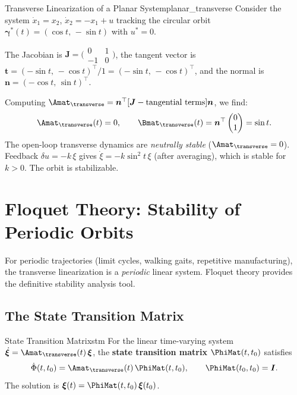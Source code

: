 \documentclass[12pt, openany]{book}
\theoremstyle{plain}
\newcommand{\traj}{\bm{\gamma}}
\begin{document}
\begin{example}{Transverse Linearization of a Planar System}{planar_transverse}
  Consider the system $\dot{x}_1 = x_2$, $\dot{x}_2 = -x_1 + u$ tracking
  the circular orbit $\traj^*(t) = (\cos t,\, -\sin t)$ with $u^* = 0$.

  The Jacobian is $\bm{J} = \bigl(\begin{smallmatrix} 0 & 1 \\ -1 & 0
  \end{smallmatrix}\bigr)$, the tangent vector is
  $\bm{t} = (-\sin t,\, -\cos t)^\top / 1 = (-\sin t,\, -\cos t)^\top$,
  and the normal is $\bm{n} = (-\cos t,\, \sin t)^\top$.

  Computing $\Amat_\transverse = \bm{n}^\top[\bm{J} - \text{tangential terms}]\bm{n}$,
  we find:
  \begin{equation}
    \Amat_\transverse(t) = 0, \qquad \Bmat_\transverse(t) = \bm{n}^\top
    \begin{pmatrix} 0 \\ 1 \end{pmatrix} = \sin t.
  \end{equation}
  The open-loop transverse dynamics are \emph{neutrally stable}
  ($\Amat_\transverse = 0$). Feedback $\delta u = -k\, \xi$ gives
  $\dot{\xi} = -k\sin^2\!t\, \xi$ (after averaging), which is stable
  for $k > 0$. The orbit is stabilizable.
\end{example}

\section{Floquet Theory: Stability of Periodic Orbits}

For periodic trajectories (limit cycles, walking gaits, repetitive
manufacturing), the transverse linearization is a \emph{periodic} linear
system. Floquet theory provides the definitive stability analysis tool.

\subsection{The State Transition Matrix}

\begin{definition}{State Transition Matrix}{stm}
  For the linear time-varying system $\dot{\bm{\xi}} = \Amat_\transverse(t)\,
  \bm{\xi}$, the \textbf{state transition matrix}
  $\PhiMat(t, t_0)$ satisfies
  \begin{equation}
    \dot{\Phi}(t, t_0) = \Amat_\transverse(t)\, \PhiMat(t, t_0), \qquad
    \PhiMat(t_0, t_0) = \bm{I}.
  \end{equation}
  The solution is $\bm{\xi}(t) = \PhiMat(t, t_0)\, \bm{\xi}(t_0)$.
\end{definition}
\end{document}
